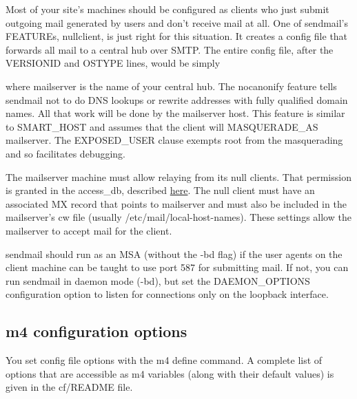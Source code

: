 Most of your site's machines should be configured as clients who just
submit outgoing mail generated by users and don't receive mail at all.
One of {sendmail's} {FEATURE}s, {nullclient}, is just right for this
situation. It creates a config file that forwards all mail to a central
hub over SMTP. The entire config file, after the {VERSIONID} and
{OSTYPE} lines, would be simply


where {mailserver} is the name of your central hub. The {nocanonify}
feature tells {sendmail} not to do DNS lookups or rewrite addresses with
fully qualified domain names. All that work will be done by the
{mailserver} host. This feature is similar to {SMART\_HOST} and assumes
that the client will {MASQUERADE\_AS} {mailserver}. The {EXPOSED\_USER}
clause exempts root from the masquerading and so facilitates debugging.

The {mailserver} machine must allow relaying from its null clients. That
permission is granted in the {access\_db}, described
\protect\hyperlink{part0026_split_034.htmlux5cux23_idTextAnchor1078}{here}.
The null client must have an associated MX record that points to
{mailserver} and must also be included in the {mailserver}'s {cw} file
(usually {/etc/mail/local-host-names}). These settings allow the
{mailserver} to accept mail for the client.

{sendmail} should run as an MSA (without the {-bd} flag) if the user
agents on the client machine can be taught to use port 587 for
submitting mail. If not, you can run {sendmail} in daemon mode ({-bd}),
but set the {DAEMON\_OPTIONS} configuration option to listen for
connections only on the loopback interface.

\protect\hypertarget{part0026_split_036.html}{}{}

\hypertarget{part0026_split_036.htmlux5cux23_idContainer1247}{}
\hypertarget{part0026_split_036.htmlux5cux23calibre_pb_35}{%
\subsection[ configuration
options]{\texorpdfstring{{\protect\hypertarget{part0026_split_036.htmlux5cux23_idTextAnchor1086}{}{}m4}
configuration
options}{m4 configuration options}}\label{part0026_split_036.htmlux5cux23calibre_pb_35}}

You set config file options with the {m4} {define} command. A complete
list of options that are accessible as {m4} variables (along with their
default values) is given in the {cf/README} file.

